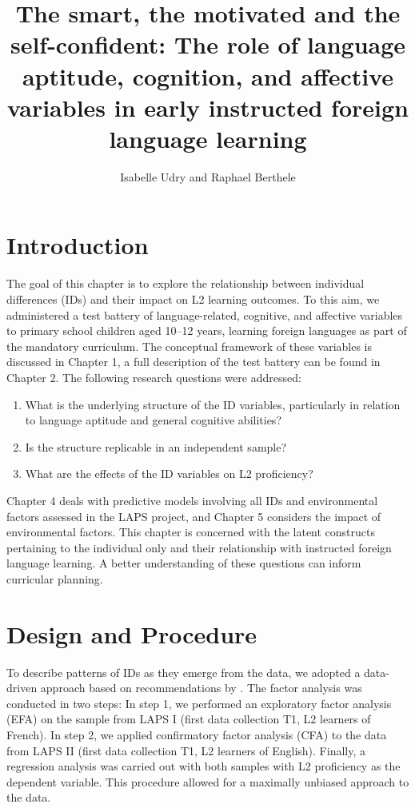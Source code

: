 \documentclass[output=paper]{langsci/langscibook}
\author{Isabelle Udry\orcid{}\affiliation{University of Fribourg, Institut de Plurilinguisme; Zurich University of Teacher Education} and Raphael Berthele\orcid{}\affiliation{University of Fribourg, Institut de Plurilinguisme}}
\title[The smart, the motivated and the self-confident]
      {The smart, the motivated and the self-confident: The role of language aptitude, cognition, and affective variables in early instructed foreign language learning}
\begin{document}
\maketitle 

\section{Introduction}

The goal of this chapter is to explore the relationship between individual differences (IDs) and their impact on L2 learning outcomes. To this aim, we administered a test battery of language-related, cognitive, and affective variables to primary school children aged 10--12 years, learning foreign languages as part of the mandatory curriculum. The conceptual framework of these variables is discussed in Chapter 1, a full description of the test battery can be found in Chapter 2. The following research questions were addressed:

\begin{enumerate}
\item  What is the underlying structure of the ID variables, particularly in relation to language aptitude and general cognitive abilities?
\item  Is the structure replicable in an independent sample?
\item  What are the effects of the ID variables on L2 proficiency?
\end{enumerate}

Chapter 4 deals with predictive models involving all IDs and environmental factors assessed in the LAPS project, and Chapter 5 considers the impact of environmental factors. This chapter is concerned with the latent constructs pertaining to the individual only and their relationship with instructed foreign language learning. A better understanding of these questions can inform curricular planning. 

\section{Design and Procedure} %

To describe patterns of IDs as they emerge from the data, we adopted a data-driven approach based on recommendations by \citet{Brown2006}. The factor analysis was conducted in two steps: In step 1, we performed an exploratory factor analysis (EFA) on the sample from LAPS I (first data collection T1, L2 learners of French). In step 2, we applied confirmatory factor analysis (CFA) to the data from LAPS II (first data collection T1, L2 learners of English). Finally, a regression analysis was carried out with both samples with L2 proficiency as the dependent variable. This procedure allowed for a maximally unbiased approach to the data. 
\end{document}
